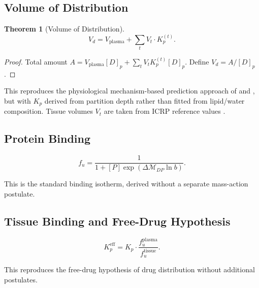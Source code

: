 \documentclass[twocolumn,10pt,a4paper]{article}
\newtheorem{theorem}{Theorem}[section]
\theoremstyle{definition}
\theoremstyle{remark}
\newcommand{\Depth}{\mathcal{M}}
\begin{document}
\subsection{Volume of Distribution}

\begin{theorem}[Volume of Distribution]
\label{thm:Vd}
\begin{equation}
    V_d = V_{\mathrm{plasma}} + \sum_t V_t\cdot K_p^{(t)}.
    \label{eq:Vd}
\end{equation}
\end{theorem}

\begin{proof}
Total amount $A = V_{\mathrm{plasma}}[D]_p + \sum_t V_t K_p^{(t)}[D]_p$. Define $V_d = A/[D]_p$.
\end{proof}

This reproduces the physiological mechanism-based prediction approach of \citet{poulin_theil_2002} and \citet{rodgers_rowland_2006}, but with $K_p$ derived from partition depth rather than fitted from lipid/water composition. Tissue volumes $V_t$ are taken from ICRP reference values \citep{valentin_2002}.

\subsection{Protein Binding}

\begin{equation}
    f_u = \frac{1}{1 + [P]\exp(\Delta\Depth_{DP}\ln b)}.
\end{equation}

This is the standard binding isotherm, derived without a separate mass-action postulate.

\subsection{Tissue Binding and Free-Drug Hypothesis}

\begin{equation}
    K_p^{\mathrm{eff}} = K_p\cdot\frac{f_u^{\mathrm{plasma}}}{f_u^{\mathrm{tissue}}}.
\end{equation}

This reproduces the free-drug hypothesis of drug distribution without additional postulates.
\end{document}
